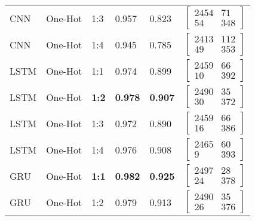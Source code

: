 \begin{table}[ht]
\begin{tabular}{llllll}
        CNN & One-Hot & 1:3 & 0.957 & 0.823 & 
    	$\begin{bmatrix}
            2454 & 71\\ 
            54 & 348
        \end{bmatrix}$
        \\
        
        CNN & One-Hot & 1:4 & 0.945 & 0.785 & 
    	$\begin{bmatrix}
            2413 & 112\\ 
            49 & 353
        \end{bmatrix}$
        \\\midrule
        
        LSTM & One-Hot & 1:1 & 0.974 & 0.899 & 
    	$\begin{bmatrix}
            2459 & 66\\ 
            10 & 392
        \end{bmatrix}$
        \\
        
        LSTM & One-Hot & \textbf{1:2} & \textbf{0.978} & \textbf{0.907} & 
    	$\begin{bmatrix}
            2490 & 35\\ 
            30 & 372
        \end{bmatrix}$
        \\
        
        LSTM & One-Hot & 1:3 & 0.972 & 0.890 & 
    	$\begin{bmatrix}
            2459 & 66\\ 
            16 & 386
        \end{bmatrix}$
        \\
        
        LSTM & One-Hot & 1:4 & 0.976 & 0.908 & 
    	$\begin{bmatrix}
            2465 & 60\\ 
            9 & 393
        \end{bmatrix}$
        \\\midrule
        
        GRU & One-Hot & \textbf{1:1} & \textbf{0.982} & \textbf{0.925} & 
    	$\begin{bmatrix}
            2497 & 28\\ 
            24 & 378
        \end{bmatrix}$
        \\
        
        GRU & One-Hot & 1:2 & 0.979 & 0.913 & 
    	$\begin{bmatrix}
            2490 & 35\\ 
            26 & 376
        \end{bmatrix}$
        \\
        

\end{tabular}
\end{table}

